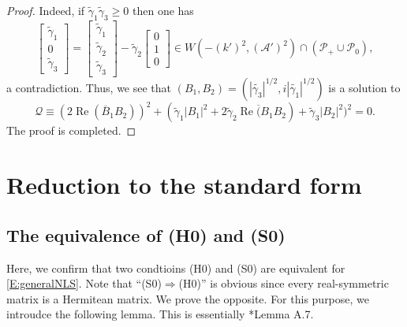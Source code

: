 \documentclass[11pt,a4paper,oneside]{amsart}
\theoremstyle{plain}
\theoremstyle{remark}
\numberwithin{equation}{section}
\renewcommand{\Re}{\operatorname{Re}}
\def\ge{\geqslant}
\theoremstyle{definition}
\begin{document}
\begin{proof}
Indeed, if $\widetilde{\gamma}_1\widetilde{\gamma}_3\ge0$ then
one has
\[
	\begin{bmatrix} \widetilde{\gamma}_1\\
0\\\widetilde{\gamma}_3
	\end{bmatrix}	
	= 	\begin{bmatrix} \widetilde{\gamma}_1\\
\widetilde{\gamma}_2\\\widetilde{\gamma}_3
	\end{bmatrix}	
	-\widetilde{\gamma}_2 	\begin{bmatrix} 
	0\\1\\0
	\end{bmatrix}	
	\in W(-(k')^2,(\mathscr{A}')^2) \cap (\mathcal{P}_+\cup \mathcal{P}_0),
\]
a contradiction.
Thus, we see that $(B_1,B_2)=(|\widetilde{\gamma_3}|^{1/2},i|\widetilde{\gamma_1}|^{1/2})$ is a solution to
\[
	\mathcal{Q} \equiv (2\Re( \overline{B}_1 B_2))^2 + (\widetilde{\gamma}_1 |B_1|^2 +2\widetilde{\gamma}_2\Re \overline({B}_1 B_2) + \widetilde{\gamma}_3 |B_2|^2)^2
=0.
\]
The proof is completed.
\end{proof}



\section{Reduction to the standard form}\label{S:ps}
\subsection{The equivalence of (H0) and (S0)}\label{S:nullcond}

Here, we confirm that two condtioins (H0) and (S0) are equivalent for \eqref{E:generalNLS}.
Note that ``(S0)$\Rightarrow$(H0)'' is obvious since every real-symmetric matrix is a Hermitean matrix. We prove the opposite.
For this purpose, we introudce the following lemma. This is essentially \cite{MSU2}*{Lemma A.7}.
\end{document}
